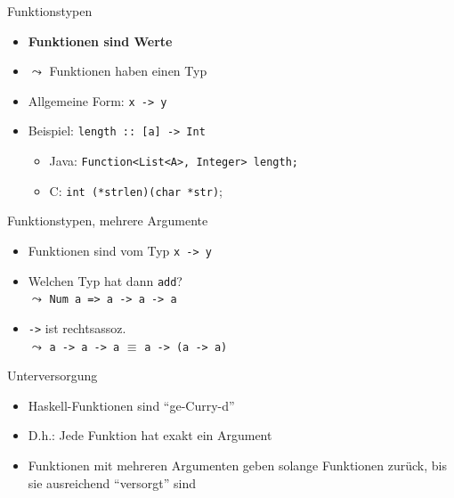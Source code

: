 \documentclass{beamer}
\begin{document}
\begin{frame}{Funktionstypen}
        \begin{itemize}
                \item \textbf{Funktionen sind Werte}
                \item $\leadsto$ Funktionen haben einen Typ
                \item Allgemeine Form: \texttt{x -> y}
                \item Beispiel: \texttt{length :: [a] -> Int}
                \begin{itemize}
                        \item Java: \texttt{Function<List<A>, Integer> length;}
                        \item C: \texttt{int (*strlen)(char *str)};
                \end{itemize}
        \end{itemize}
\end{frame}

\begin{frame}{Funktionstypen, mehrere Argumente}

        \begin{itemize}
                \item Funktionen sind vom Typ \texttt{x -> y}
                \item Welchen Typ hat dann \texttt{add}? \\
                \pause
                $\leadsto$ \texttt{Num a => a -> a -> a}
                \item \texttt{->} ist rechtsassoz. \\
                $\leadsto$ \texttt{a -> a -> a} $\equiv$ \texttt{a -> (a -> a)}
        \end{itemize}
\end{frame}

\begin{frame}{Unterversorgung}
        \begin{itemize}
                \item Haskell-Funktionen sind \enquote{ge-Curry-d}
                \item D.h.: Jede Funktion hat exakt ein Argument
                \item Funktionen mit mehreren Argumenten geben solange Funktionen zurück, bis sie ausreichend \enquote{versorgt} sind
        \end{itemize}

\end{frame}
\end{document}
